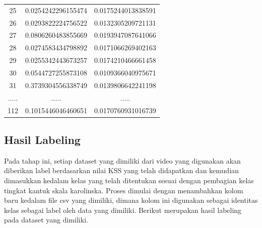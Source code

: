 \begin{longtable}{|c|c|c|}
  25  & 0.0254242296155474 & 0.0175244013838591 \\
  26  & 0.0293822224756522 & 0.0132305209721131 \\
  27  & 0.0806260483855669 & 0.0193947087641066 \\
  28  & 0.0274583434798892 & 0.0171066269402163 \\
  29  & 0.0255342443673257 & 0.0174210466661458 \\
  30  & 0.0544727255873108 & 0.0109366040975671 \\
  31  & 0.3739304556338749 & 0.0139806642241198 \\
  ..... & ..... & ..... \\
  112 & 0.1015446046460651 & 0.0170760931016739 \\
  \hline
\end{longtable}

\subsection{Hasil Labeling}
Pada tahap ini, setiap dataset yang dimiliki dari video yang digunakan akan diberikan label berdasarkan nilai KSS yang telah didapatkan dan kemudian dimasukkan kedalam kelas yang telah ditentukan sesuai dengan pembagian kelas tingkat kantuk skala karolinska. Proses dimulai dengan menambahkan kolom baru kedalam file csv yang dimiliki, dimana kolom ini digunakan sebagai identitas kelas sebagai label oleh data yang dimiliki. Berikut merupakan hasil labeling pada dataset yang dimiliki.


